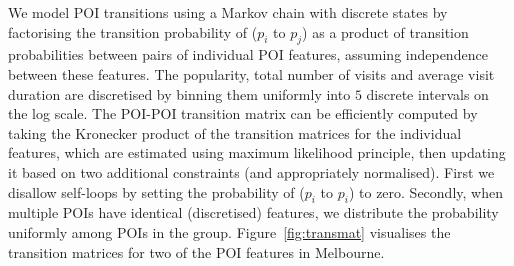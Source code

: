 We model POI transitions using a Markov chain with discrete %
states by factorising the transition probability of ($p_i$ to $p_j$) %
as a product of transition probabilities between pairs of individual POI features, %
assuming independence between these features.
The popularity, total number of visits and average visit duration are discretised by binning
them uniformly into $5$ discrete intervals on the log scale.
The POI-POI transition matrix can be efficiently computed by taking the Kronecker product of
the transition matrices for the individual features, which are estimated using maximum likelihood principle,
then updating it based on two additional constraints (and appropriately normalised).
First we disallow self-loops by setting the probability of ($p_i$ to $p_i$) to zero.
Secondly, when multiple POIs have identical (discretised) features, we distribute the probability uniformly among POIs in the group.
Figure~\ref{fig:transmat} visualises the transition matrices for two of the POI features in Melbourne.
